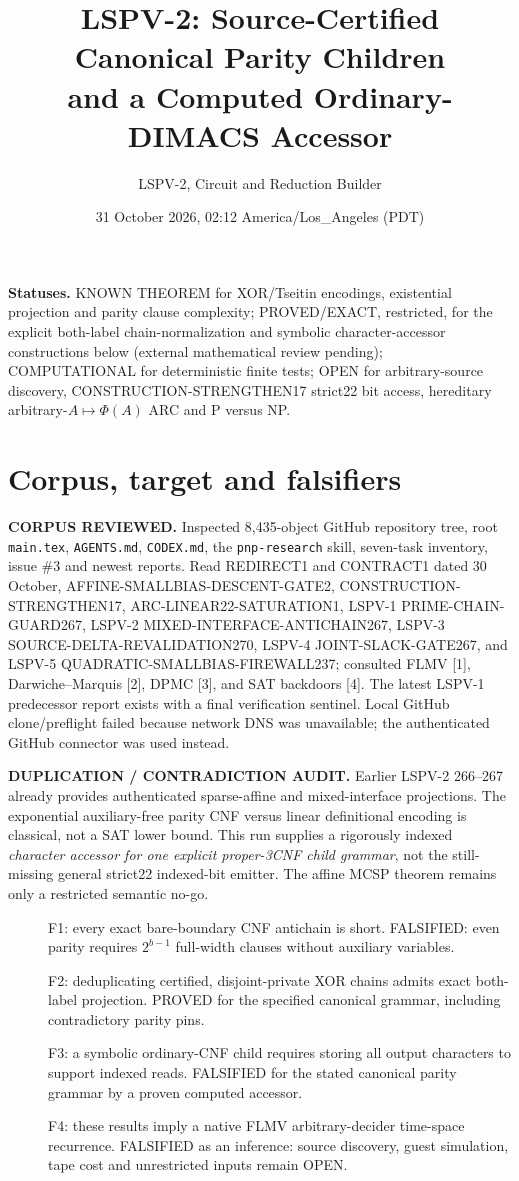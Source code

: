 \documentclass[11pt]{article}
\title{LSPV-2: Source-Certified Canonical Parity Children\\and a Computed Ordinary-DIMACS Accessor}
\author{LSPV-2, Circuit and Reduction Builder}
\date{31 October 2026, 02:12 America/Los\_Angeles (PDT)}
\begin{document}
\maketitle
\noindent\textbf{Statuses.} KNOWN THEOREM for XOR/Tseitin encodings, existential projection and parity clause complexity; PROVED/EXACT, restricted, for the explicit both-label chain-normalization and symbolic character-accessor constructions below (external mathematical review pending); COMPUTATIONAL for deterministic finite tests; OPEN for arbitrary-source discovery, CONSTRUCTION-STRENGTHEN17 strict22 bit access, hereditary arbitrary-$A\mapsto\Phi(A)$ ARC and P versus NP.

\section{Corpus, target and falsifiers}
\noindent\textbf{CORPUS REVIEWED.} Inspected 8,435-object GitHub repository tree, root \texttt{main.tex}, \texttt{AGENTS.md}, \texttt{CODEX.md}, the \texttt{pnp-research} skill, seven-task inventory, issue \#3 and newest reports. Read REDIRECT1 and CONTRACT1 dated 30 October, AFFINE-SMALLBIAS-DESCENT-GATE2, CONSTRUCTION-STRENGTHEN17, ARC-LINEAR22-SATURATION1, LSPV-1 PRIME-CHAIN-GUARD267, LSPV-2 MIXED-INTERFACE-ANTICHAIN267, LSPV-3 SOURCE-DELTA-REVALIDATION270, LSPV-4 JOINT-SLACK-GATE267, and LSPV-5 QUADRATIC-SMALLBIAS-FIREWALL237; consulted FLMV [1], Darwiche--Marquis [2], DPMC [3], and SAT backdoors [4]. The latest LSPV-1 predecessor report exists with a final verification sentinel. Local GitHub clone/preflight failed because network DNS was unavailable; the authenticated GitHub connector was used instead.

\noindent\textbf{DUPLICATION / CONTRADICTION AUDIT.} Earlier LSPV-2 266--267 already provides authenticated sparse-affine and mixed-interface projections. The exponential auxiliary-free parity CNF versus linear definitional encoding is classical, not a SAT lower bound. This run supplies a rigorously indexed \emph{character accessor for one explicit proper-3CNF child grammar}, not the still-missing general strict22 indexed-bit emitter. The affine MCSP theorem remains only a restricted semantic no-go.

\begin{description}
\item[] F1: every exact bare-boundary CNF antichain is short. FALSIFIED: even parity requires $2^{b-1}$ full-width clauses without auxiliary variables.
\item[] F2: deduplicating certified, disjoint-private XOR chains admits exact both-label projection. PROVED for the specified canonical grammar, including contradictory parity pins.
\item[] F3: a symbolic ordinary-CNF child requires storing all output characters to support indexed reads. FALSIFIED for the stated canonical parity grammar by a proven computed accessor.
\item[] F4: these results imply a native FLMV arbitrary-decider time-space recurrence. FALSIFIED as an inference: source discovery, guest simulation, tape cost and unrestricted inputs remain OPEN.
\end{description}
\end{document}
